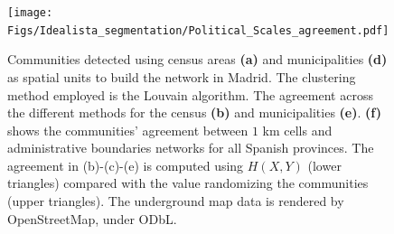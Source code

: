 \begin{figure}[t]
    \centering
    \texttt{[image: Figs/Idealista\_segmentation/Political\_Scales\_agreement.pdf]}
	\caption[Community detection from networks using administrative spatial units.]{ Communities detected using census areas \textbf{(a)} and municipalities \textbf{(d)} as spatial units to build the network in Madrid. The clustering method employed is the Louvain algorithm. The agreement across the different methods for the census \textbf{(b)} and municipalities \textbf{(e)}. \textbf{(f)} shows the communities' agreement between $1$ km cells and administrative boundaries networks for all Spanish provinces. The agreement in (b)-(c)-(e) is computed using $H(X,Y)$ (lower triangles) compared with the value randomizing the communities (upper triangles).  The underground map data is rendered by OpenStreetMap, under ODbL. \label{fig:political_scales}}
\end{figure}

